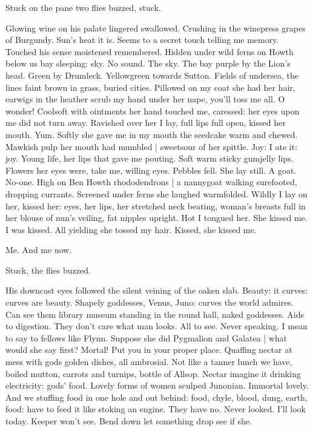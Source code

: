 Stuck on the pane two flies buzzed,
stuck.

Glowing wine on his palate lingered swallowed.
Crushing in the winepress grapes of Burgundy.
Sun's heat it is.
Seems to a secret touch telling me memory.
Touched his sense moistened remembered.
Hidden under wild ferns on Howth below us bay sleeping:
sky.
No sound.
The sky.
The bay purple by the Lion's head.
Green by Drumleck.
Yellowgreen towards Sutton.
Fields of undersea,
the lines faint brown in grass,
buried cities.
Pillowed on my coat she had her hair,
earwigs in the heather scrub my hand under her nape,
you'll toss me all.
O wonder!
Coolsoft with ointments her hand touched me,
caressed:
her eyes upon me did not turn away.
Ravished over her I lay,
full lips full open,
kissed her mouth.
Yum.
Softly she gave me in my mouth the seedcake warm and chewed.
Mawkish pulp her mouth had mumbled |
sweetsour of her spittle.
Joy:
I ate it:
joy.
Young life,
her lips that gave me pouting.
Soft warm sticky gumjelly lips.
Flowers her eyes were,
take me, willing eyes.
Pebbles fell.
She lay still.
A goat.
No-one.
High on Ben Howth rhododendrons |
a nannygoat walking surefooted, dropping currants.
Screened under ferns she laughed warmfolded.
Wildly I lay on her,
kissed her:
eyes, her lips,
her stretched neck beating,
woman's breasts full in her blouse of nun's veiling,
fat nipples upright.
Hot I tongued her.
She kissed me.
I was kissed.
All yielding she tossed
my hair.
Kissed, she kissed me.

Me.
And me now.

Stuck,
the flies buzzed.

His downcast eyes followed the silent veining of the oaken slab.
Beauty:
it curves:
curves are beauty.
Shapely goddesses,
Venus, Juno:
curves the world admires.
Can see them library museum standing in the round hall,
naked goddesses.
Aids to digestion.
They don't care what man looks.
All to see.
Never speaking.
I mean to say to fellows like Flynn.
Suppose she did Pygmalion and Galatea |
what would she say first?
Mortal!
Put you in your proper place.
Quaffing nectar at mess with gods golden dishes,
all ambrosial.
Not like a tanner lunch we have,
boiled mutton, carrots and turnips,
bottle of Allsop.
Nectar imagine it drinking electricity:
gods' food.
Lovely forms of women sculped Junonian.
Immortal lovely.
And we stuffing food in one hole and out behind:
food, chyle, blood, dung, earth, food:
have to feed it like stoking an engine.
They have no.
Never looked.
I'll look today.
Keeper won't see.
Bend down let something drop
see if she.

